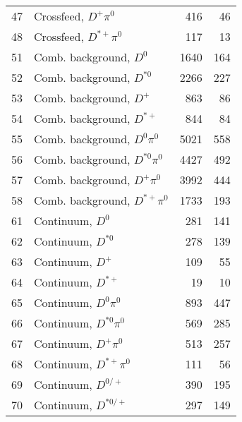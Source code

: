 \documentclass[6pt]{article}
\begin{document}
\begin{tabular}{r l r r }
47   & Crossfeed, $D^{+} \pi^0$                               &  416	     &   46	       \\
48   & Crossfeed, $D^{*+} \pi^0$                              &  117	     &   13	       \\\hline       
51   & Comb. background, $D^{0} $                             &  1640 	     &   164	       \\
52   & Comb. background, $D^{*0} $                            &  2266 	     &   227	       \\
53   & Comb. background, $D^{+} $                             &  863  	     &   86	       \\
54   & Comb. background, $D^{*+} $                            &  844  	     &   84	       \\
55   & Comb. background, $D^{0} \pi^0$                        &  5021 	     &   558	       \\
56   & Comb. background, $D^{*0} \pi^0$                       &  4427 	     &   492	       \\
57   & Comb. background, $D^{+} \pi^0$                        &  3992 	     &   444	       \\
58   & Comb. background, $D^{*+} \pi^0$                       &  1733 	     &   193	       \\\hline
61   & Continuum, $D^{0} $                                    &  281         &   141	        \\
62   & Continuum, $D^{*0} $                                   &  278         &   139	        \\
63   & Continuum, $D^{+} $                                    &  109         &   55	        \\
64   & Continuum, $D^{*+} $                                   &  19          &   10	        \\
65   & Continuum, $D^{0} \pi^0$                               &  893         &   447	        \\
66   & Continuum, $D^{*0} \pi^0$                              &  569         &   285	        \\
67   & Continuum, $D^{+} \pi^0$                               &  513         &   257	        \\
68   & Continuum, $D^{*+} \pi^0$                              &  111         &   56 	        \\       
69   & Continuum, $D^{0/+} $                                  &  390         &   195	        \\
70   & Continuum, $D^{*0/+} $                                 &  297         &   149             \\
\hline \hline 
\end{tabular}
\end{document}
